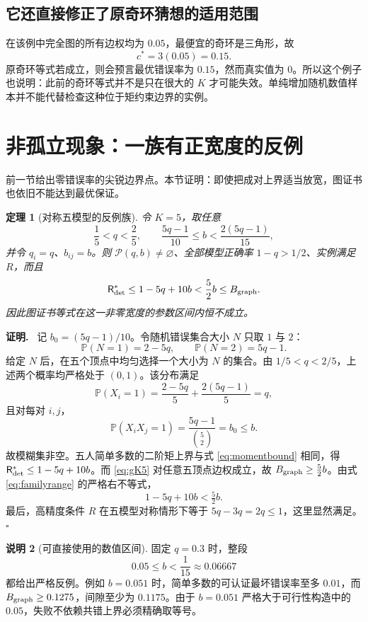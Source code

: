 \documentclass[11pt,a4paper]{ctexart}
\newtheorem{theorem}{定理}[section]
\theoremstyle{definition}
\newtheorem{remark}[theorem]{说明}
\newenvironment{proofcn}{\par\noindent\textbf{证明.}\ }{\hfill $\square$\par}
\newcommand{\PP}{\mathcal P}
\newcommand{\Risk}{\mathsf R}
\newcommand{\Prb}{\mathbb P}
\begin{document}
\subsection{它还直接修正了原奇环猜想的适用范围}
在该例中完全图的所有边权均为 $0.05$，最便宜的奇环是三角形，故
\[
c^*=3(0.05)=0.15.
\]
原奇环等式若成立，则会预言最优错误率为 $0.15$，然而真实值为 $0$。所以这个例子也说明：此前的奇环等式并不是只在很大的 $K$ 才可能失效。单纯增加随机数值样本并不能代替检查这种位于矩约束边界的实例。

\section{非孤立现象：一族有正宽度的反例}
前一节给出零错误率的尖锐边界点。本节证明：即使把成对上界适当放宽，图证书也依旧不能达到最优保证。

\begin{theorem}[对称五模型的反例族]\label{thm:family}
令 $K=5$，取任意
\begin{equation}\label{eq:familyrange}
\frac15<q<\frac25,\qquad
\frac{5q-1}{10}\le b<\frac{2(5q-1)}{15},
\end{equation}
并令 $q_i=q$、$b_{ij}=b$。则 $\PP(q,b)\ne\varnothing$、全部模型正确率 $1-q>1/2$、实例满足 $R$，而且
\begin{equation}\label{eq:familygap}
\Risk^*_{\rm det}\le1-5q+10b
<\frac52b\le B_{\rm graph}.
\end{equation}
因此图证书等式在这一非零宽度的参数区间内恒不成立。
\end{theorem}
\begin{proofcn}
记 $b_0=(5q-1)/10$。令随机错误集合大小 $N$ 只取 $1$ 与 $2$：
\[
\Prb(N=1)=2-5q,\qquad\Prb(N=2)=5q-1.
\]
给定 $N$ 后，在五个顶点中均匀选择一个大小为 $N$ 的集合。由 $1/5<q<2/5$，上述两个概率均严格处于 $(0,1)$。该分布满足
\[
\Prb(X_i=1)=\frac{2-5q}{5}+\frac{2(5q-1)}{5}=q,
\]
且对每对 $i,j$，
\[
\Prb(X_iX_j=1)=\frac{5q-1}{\binom52}=b_0\le b.
\]
故模糊集非空。五人简单多数的二阶矩上界与式 \eqref{eq:momentbound} 相同，得 $\Risk^*_{\rm det}\le1-5q+10b$。而 \eqref{eq:gK5} 对任意五顶点边权成立，故 $B_{\rm graph}\ge\tfrac52b$。由式 \eqref{eq:familyrange} 的严格右不等式，
\[
1-5q+10b<\tfrac52b.
\]
最后，高精度条件 $R$ 在五模型对称情形下等于 $5q-3q=2q\le1$，这里显然满足。
\end{proofcn}

\begin{remark}[可直接使用的数值区间]
固定 $q=0.3$ 时，整段
\[
\boxed{0.05\le b<\frac1{15}\approx0.06667}
\]
都给出严格反例。例如 $b=0.051$ 时，简单多数的可认证最坏错误率至多 $0.01$，而 $B_{\rm graph}\ge0.1275$，间隙至少为 $0.1175$。由于 $b=0.051$ 严格大于可行性构造中的 $0.05$，失败不依赖共错上界必须精确取等号。
\end{remark}
\end{document}
